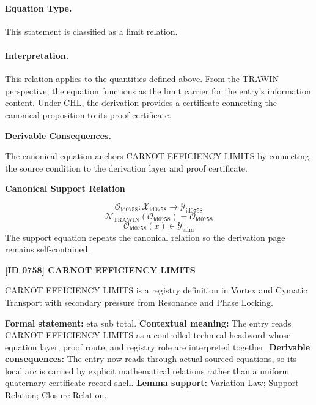\paragraph{Equation Type.}
This statement is classified as a limit relation.

\paragraph{Interpretation.}
This relation applies to the quantities defined above. From the TRAWIN perspective, the equation functions as the limit carrier for the entry’s information content. Under CHL, the derivation provides a certificate connecting the canonical proposition to its proof certificate.

\par\vspace{0.35em}
\noindent\textbf{Derivable Consequences.}\quad
\begingroup
\footnotesize
\raggedright
The canonical equation anchors CARNOT EFFICIENCY LIMITS by connecting the source condition to the derivation layer and proof certificate.
\par\endgroup

\noindent\textbf{Canonical Support Relation}\par
\[
\mathcal{O}_{\mathrm{id0758}}:\mathcal{X}_{\mathrm{id0758}}\longrightarrow\mathcal{Y}_{\mathrm{id0758}}
\]
\[
\mathcal{N}_{\mathrm{TRAWIN}}(\mathcal{O}_{\mathrm{id0758}})=\mathcal{O}_{\mathrm{id0758}}
\]
\[
\mathcal{O}_{\mathrm{id0758}}(x)\in\mathcal{Y}_{\mathrm{adm}}
\]
\noindent The support equation repeats the canonical relation so the derivation page remains self-contained.\par

\clearpage
\noindent\textbf{[ID 0758] CARNOT EFFICIENCY LIMITS}\par
\vspace{0.35em}
\begingroup\small
{}
CARNOT EFFICIENCY LIMITS is a registry definition in Vortex and Cymatic Transport with secondary pressure from Resonance and Phase Locking.

\begingroup\footnotesize\setlength{\emergencystretch}{3em}\sloppy
\textbf{Formal statement:} eta sub total. \textbf{Contextual meaning:} The entry reads CARNOT EFFICIENCY LIMITS as a controlled technical headword whose equation layer, proof route, and registry role are interpreted together. \textbf{Derivable consequences:} The entry now reads through actual sourced equations, so its local arc is carried by explicit mathematical relations rather than a uniform quaternary certificate record shell. \textbf{Lemma support:} Variation Law; Support Relation; Closure Relation.\par
\endgroup

